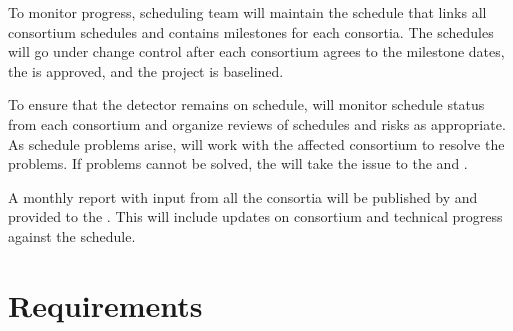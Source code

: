 To monitor progress,  scheduling team will maintain the
 schedule that links all consortium schedules and
contains milestones for each consortia.  The schedules will go under
change control after each consortium agrees to the milestone dates,
the  is approved, and the  project is baselined.

To ensure that the  detector remains on schedule,
 will monitor schedule status from each
consortium and organize reviews of schedules and risks as appropriate.
As schedule problems arise,  will work with the affected
consortium to resolve the problems. If problems cannot be solved, the
 will take the issue to the  and .

A monthly report with input from all the consortia will be published by
 and provided to the . This will
include updates on consortium and  technical progress
against the schedule.


\section{Requirements}
\label{sec:fdsp-coord-requirements}

